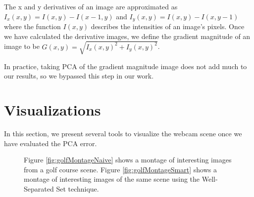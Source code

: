 The x and y derivatives of an image are approximated as $I_x(x,y) = I(x,y)-I(x-1,y)$ and $I_y(x,y) = I(x,y)-I(x,y-1)$ where the function $I(x,y)$ describes the intensities of an image's pixels.  Once we have calculated the derivative images, we define the gradient magnitude of an image to be $G(x,y) = \sqrt{I_x(x,y)^2 + I_y(x,y)^2}$.

In practice, taking PCA of the gradient magnitude image does not add much to our results, so we bypassed this step in our work.


\pagebreak{}
\section{Visualizations}

In this section, we present several tools to visualize the webcam scene once we have evaluated the PCA error.

\begin{figure}[t]
	\centering
		\caption[Image montage techniques.]{Figure \ref{fig:golfMontageNaive} shows a montage of interesting images from a golf course scene. Figure \ref{fig:golfMontageSmart} shows a montage of interesting images of the same scene using the Well-Separated Set technique.}
\end{figure}

